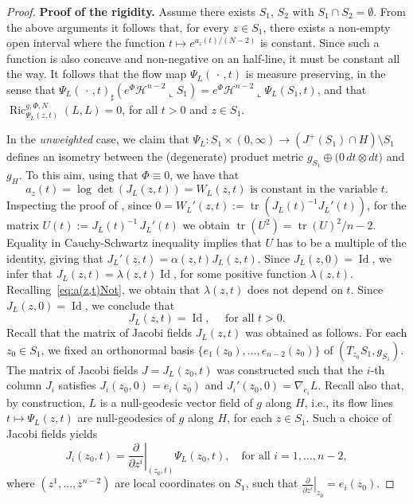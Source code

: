 \documentclass[12pt,a4paper]{amsart}
\theoremstyle{plain}
\theoremstyle{definition}
\numberwithin{equation}{section}
\DeclareMathOperator{\Ric}{Ric}
\DeclareMathOperator{\id}{Id}
\DeclareMathOperator{\tr}{tr}
\newcommand{\haus}{\mathcal{H}}
\newcommand{\dotargument}{\,\cdot\,}
\begin{document}
\begin{proof}
  \smallskip

  
  \textbf{Proof of the rigidity.} Assume there exists $S_1,\,S_2$ with $S_1\cap S_2=\emptyset$. From the above arguments it follows that, for every $z\in S_1$, there exists a non-empty open interval where the function $t \mapsto e^{a_z(t)/(N-2)}$ is constant. Since such a function is also concave and non-negative on an half-line, it must be constant all the way. It follows that the flow map $\Psi_L(\dotargument, t)$ is measure preserving, in the sense that  $\Psi_L(\dotargument, t)_\sharp(e^{\Phi}\haus^{n-2}\llcorner S_1)= e^{\Phi}\haus^{n-2}\llcorner \Psi_L(S_1, t)$, and that 
$\Ric^{g,\Phi,N}_{\Psi_L(z,t)}(L,L) = 0$, for all $t>0$ and $z\in S_1$.

In the \emph{unweighted} case, we claim that $\Psi_L:S_1\times (0,\infty)\to (J^+(S_1)\cap H)\setminus S_1$ defines an isometry between the (degenerate) product  metric $g_{S_1}\oplus \big( 0 \, dt\otimes dt \big)$ and $g_H$.
To this aim, using that $\Phi\equiv 0$, we have that
\begin{equation}\label{eq:a(z,t)Not}
a_z(t)=\log \det(J_L(z,t))=W_L(z,t) \text{ is constant in the variable $t$}.
\end{equation}
Inspecting the proof of , since $0=W_{L}'(z,t):= \tr(J_L(t)^{-1} J_L'(t))$,
for the matrix $U(t):=J_L(t)^{-1}\, J_L'(t)$ we obtain
%
$\tr(U^2) = \tr(U)^2/n-2$.
%
Equality in Cauchy-Schwartz inequality implies that $U$ has to be a
multiple of the identity, giving that 
$J_{L}'(z,t) = \alpha(z,t) J_L(z,t)$. 
Since  $J_L(z,0) = \id$, we infer that $J_L(z,t) = \lambda(z,t) \id$, for some positive function $\lambda(z,t)$. Recalling~\eqref{eq:a(z,t)Not}, we obtain that  $\lambda(z,t)$ does not depend on $t$. Since $J_L(z,0)=\id$, we conclude that 
\begin{equation}\label{eq:JLId}
J_L(z,t) =   \id, \quad  \text{ for all $t>0$}.
\end{equation}
Recall that the matrix of Jacobi fields $J_L(z,t)$ was obtained as follows. For each $z_0\in S_1$, we fixed an orthonormal basis $\{e_1(z_0), \ldots, e_{n-2}(z_0)\}$ of $(T_{z_0} S_{1}, g_{S_1})$. The matrix of Jacobi fields $J=J_L(z_0,t)$ was constructed such that the $i$-th column $J_i$ satisfies $J_i(z_0,0)=e_i(z_0)$ and $J_i'(z_0,0)=\nabla_{e_i}L$. Recall also that, by construction, $L$ is a null-geodesic vector field of $g$ along $H$, i.e., its flow lines $t\mapsto \Psi_L(z,t)$ are null-geodesics of $g$ along $H$, for each $z\in S_1$. Such a choice of Jacobi fields yields 
\begin{equation}\label{eq:JiPsiL}
J_i(z_0,t)=\left. \frac{\partial}{\partial z^i} \right|_{(z_0,t)} \Psi_L(z_0,t), \quad \text{for all }i=1,\ldots, n-2,
\end{equation}
where $(z^1, \ldots, z^{n-2})$ are  local coordinates on $S_{1}$, such that $\left.\frac{\partial}{\partial z^i}\right|_{z_0}=e_i(z_0)$.


\end{proof}
\end{document}
